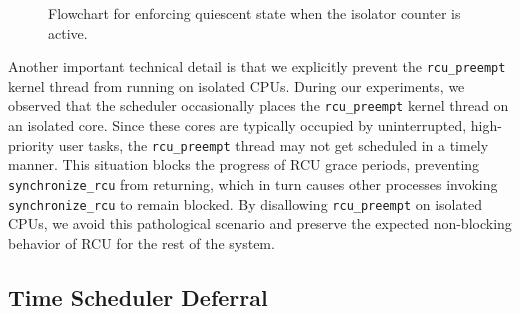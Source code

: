 \documentclass[letterpaper]{article}
\begin{document}
\begin{figure}[t]
\centering
{}
\caption{Flowchart for enforcing quiescent state when the isolator counter is active.}
\label{fig:quiescent}
\end{figure}



Another important technical detail is that we explicitly prevent the \texttt{rcu\_preempt} kernel 
thread from running on isolated CPUs. During our experiments, we observed that the scheduler 
occasionally places the \texttt{rcu\_preempt} kernel thread on an isolated core. Since these cores 
are typically occupied by uninterrupted, high-priority user tasks, the \texttt{rcu\_preempt} 
thread may not get scheduled in a timely manner. This situation blocks the progress of RCU grace 
periods, preventing \texttt{synchronize\_rcu} from returning, which in turn causes other processes 
invoking \texttt{synchronize\_rcu} to remain blocked. By disallowing \texttt{rcu\_preempt} on 
isolated CPUs, we avoid this pathological scenario and preserve the expected non-blocking behavior 
of RCU for the rest of the system.  



\subsection{Time Scheduler Deferral}
\end{document}
